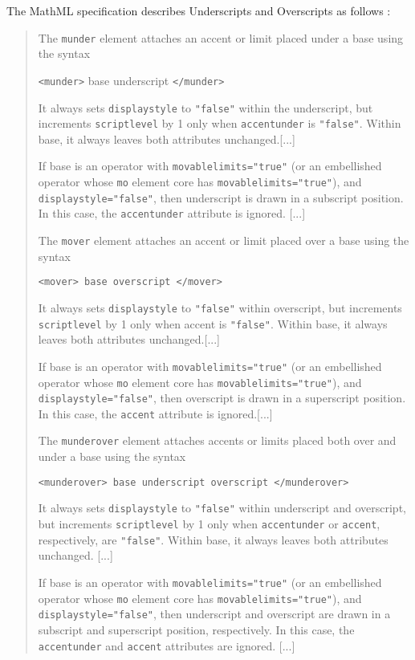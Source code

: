 The MathML specification describes Underscripts and Overscripts as
follows \cite{MathML3}:
%
\begin{quote}
The {\tt munder} element attaches an accent or limit placed under a base using
the syntax

  {\tt <munder>} base underscript {\tt </munder>}

It always sets {\tt displaystyle} to {\tt "false"} within the underscript, but
increments {\tt scriptlevel} by 1 only when {\tt accentunder} is
{\tt "false"}. Within base, it always leaves both attributes unchanged.[...]

If base is an operator with {\tt movablelimits="true"} (or an embellished
operator whose {\tt mo} element core has {\tt movablelimits="true"}), and
{\tt displaystyle="false"}, then underscript is drawn in a subscript position.
In this case, the {\tt accentunder} attribute is ignored. [...]

The {\tt mover} element attaches an accent or limit placed over a base using
the syntax

  {\tt <mover> base overscript </mover>}

It always sets {\tt displaystyle} to {\tt "false"} within overscript, but
increments {\tt scriptlevel} by 1 only when accent is {\tt "false"}.
Within base, it
always leaves both attributes unchanged.[...]

If base is an operator with {\tt movablelimits="true"} (or an embellished
operator whose {\tt mo} element core has {\tt movablelimits="true"}), and
{\tt displaystyle="false"}, then overscript is drawn in a superscript position.
In this case, the {\tt accent} attribute is ignored.[...]

The {\tt munderover} element attaches accents or limits placed both over and
under a base using the syntax

  {\tt <munderover> base underscript overscript </munderover>}

It always sets {\tt displaystyle} to {\tt "false"} within underscript and
overscript, but increments {\tt scriptlevel} by 1 only when {\tt accentunder}
or {\tt accent}, respectively, are {\tt "false"}. Within base, it always leaves
both attributes unchanged. [...]

If base is an operator with {\tt movablelimits="true"} (or an embellished
operator whose {\tt mo} element core has {\tt movablelimits="true"}), and
{\tt displaystyle="false"}, then underscript and overscript are drawn in a
subscript and superscript position, respectively. In this case, the
{\tt accentunder} and {\tt accent} attributes are ignored. [...]
\end{quote}
%

